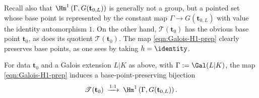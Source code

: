 Recall also that $\Hm^1\left(\Gamma,G(\mathbf{t}_{0,L})\right)$ is generally
not a group, but a pointed set whose base point is represented by the
constant map $\Gamma\to G(\mathbf{t}_{0,L})$ with value the identity
automorphism $1$. On the other hand, $\mathcal{T}(\mathbf{t}_0)$ has the
obvious base point $\mathbf{t}_0$, as does its quotient
$\mathscr{T}(\mathbf{t}_0)$. The map \eqref{eqn:Galois-H1-prep} clearly
preserves base points, as one sees by taking $h=\identity$.

\begin{theorem}\label{prop:Galois-H1}
	For data $\mathbf{t}_0$ and a Galois extension $L|K$ as above, with
	$\Gamma:=\Gal(L|K)$, the map \eqref{eqn:Galois-H1-prep} induces a
	base-point-preserving bijection
	\[
	\mathscr{T}(\mathbf{t}_0)\;\xrightarrow{1:1}\;
	\Hm^1\left(\Gamma,G(\mathbf{t}_{0,L})\right).
	\]
\end{theorem}
